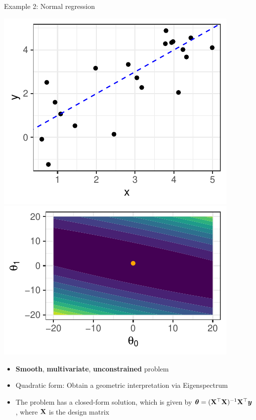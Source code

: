 \begin{vbframe}{Example 2: Normal regression}

\begin{center}
	\includegraphics[height=0.30\textwidth, keepaspectratio]{figure_man/ml_linreg_example_1.pdf} ~~ \includegraphics[height=0.30\textwidth, keepaspectratio]{figure_man/ml_linreg_example_2.pdf}
\end{center}

\begin{itemize}
	\item \textbf{Smooth}, \textbf{multivariate}, \textbf{unconstrained} problem
	\item Quadratic form: Obtain a geometric interpretation via Eigenspectrum
	\item The problem has a closed-form solution, which is given by $\bm{\theta} = (\mathbf{X}^\top \mathbf{X})^{-1}\mathbf{X}^\top \bm{y}$, where $\mathbf{X}$ is the design matrix
\end{itemize}

\end{vbframe}

